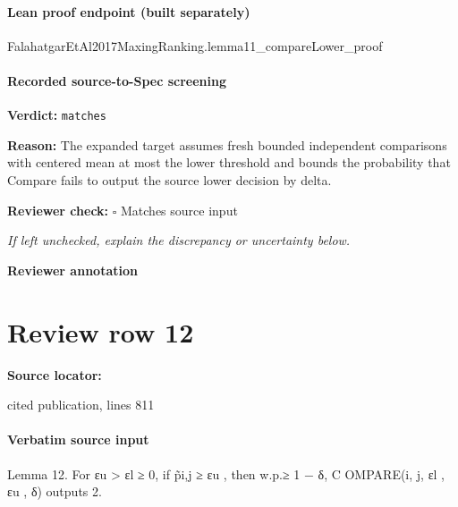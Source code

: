 \documentclass[10pt]{article}
\newcommand{\reviewerbox}{%
  \par\noindent\fbox{\parbox{0.96\linewidth}{\rule{0pt}{0.38in}}}\par
}
\newcommand{\reviewmatch}[1]{%
  \par\noindent\textbf{Reviewer check:} $\square$\; #1\par
  \noindent\emph{If left unchecked, explain the discrepancy or uncertainty below.}\par
}
\begin{document}
\paragraph{Lean proof endpoint (built separately)}\begin{ReviewVerbatim}
FalahatgarEtAl2017MaxingRanking.lemma11_compareLower_proof
\end{ReviewVerbatim}

\paragraph{Recorded source-to-Spec screening}
\textbf{Verdict:} \texttt{matches}
\\
{\raggedright
\textbf{Reason:} The expanded target assumes fresh bounded independent comparisons with centered mean at most the lower threshold and bounds the probability that Compare fails to output the source lower decision by delta.\allowbreak{}
\par}
\reviewmatch{Matches source input}
\noindent\textbf{Reviewer annotation}\par
\reviewerbox
\clearpage
\hypertarget{source-claim-b0ceb08b87d5f5f7}{}
\section*{Review row 12}
\textbf{Source locator:} {\footnotesize\raggedright cited publication, lines 811\par}
\paragraph{Verbatim source input}
\begin{ReviewVerbatim}
Lemma 12. For εu > εl ≥ 0, if p̃i,j ≥ εu , then w.p.≥ 1 − δ, C OMPARE(i, j, εl , εu , δ) outputs 2.
\end{ReviewVerbatim}
\end{document}
